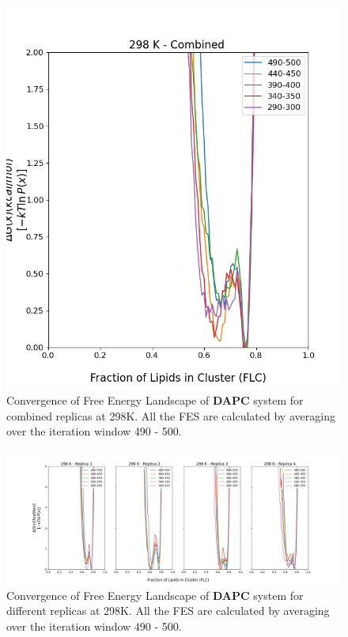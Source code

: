\documentclass{biophys-new}
\begin{document}
\begin{figure}[hbt!]
\centering
\includegraphics[width=0.6\linewidth]{all_plots/ClusterLipids2Total/DPPC_DAPC_CHOL/298K/Convergence_DAPC_MULTI__298_ClusterLipids2Total.png}
\caption{Convergence of Free Energy Landscape of \textbf{DAPC} system for combined replicas at 298K. All the FES are calculated by averaging over the iteration window 490 - 500.}
\label{fig:view}

\end{figure}

\begin{figure}[hbt!]
\centering
\includegraphics[width=1.1\linewidth]{all_plots/ClusterLipids2Total/DPPC_DAPC_CHOL/298K/Convergence_DAPC_298_ClusterLipids2Total.png}
\caption{Convergence of Free Energy Landscape of \textbf{DAPC} system for different replicas at 298K. All the FES are calculated by averaging over the iteration window 490 - 500.}
\label{fig:view}

\end{figure}
\end{document}
